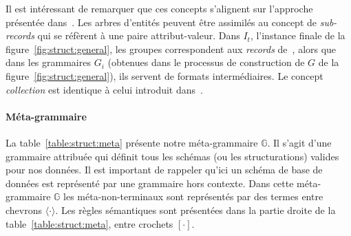 Il est intéressant de remarquer que ces concepts s'alignent sur l'approche présentée dans~\cite{barretGenericAbstractionsData2021}.
Les arbres d'entités peuvent être assimilés au concept de \emph{sub-records} qui se réfèrent à une paire attribut-valeur.
Dans $I_t$, l'instance finale de la figure~\ref{fig:struct:general}, les groupes correspondent aux \emph{records} de~\cite{barretGenericAbstractionsData2021}, alors que dans les grammaires $G_i$ (obtenues dans le processus de construction de $G$ de la figure~\ref{fig:struct:general}), ils servent de formats intermédiaires.
Le concept \textit{collection} est identique à celui introduit dans~\cite{barretGenericAbstractionsData2021}.

\paragraph{Méta-grammaire}
La table~\ref{table:struct:meta} présente notre méta-grammaire $\mathbb{G}$.
Il s'agit d'une grammaire attribuée qui définit tous les schémas (ou les structurations) valides pour nos données.
Il est important de rappeler qu'ici un schéma de base de données est représenté par une grammaire hors contexte.
Dans cette méta-grammaire $\mathbb{G}$ les méta-non-terminaux sont représentés par des termes entre chevrons $\langle \cdot \rangle$.
Les règles sémantiques sont présentées dans la partie droite de la table~\ref{table:struct:meta}, entre crochets $[ \cdot ]$.

